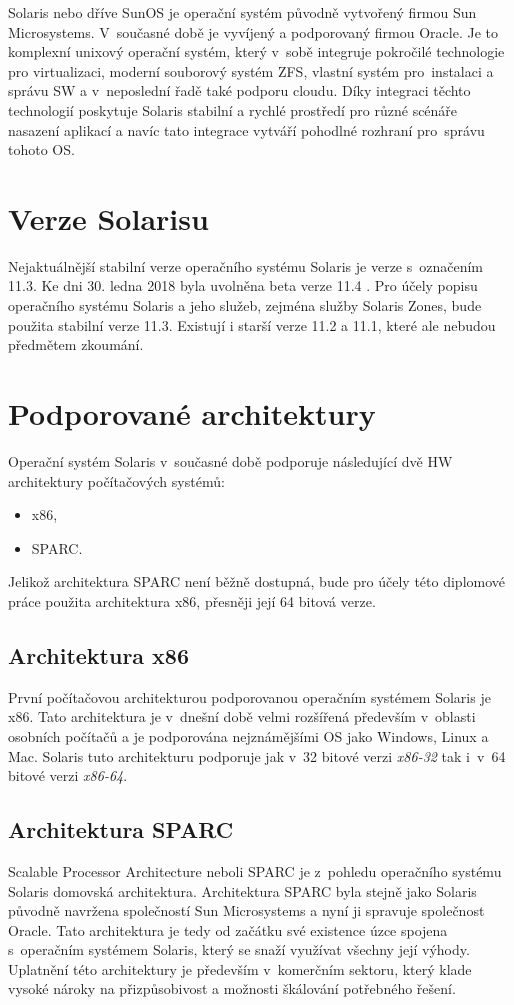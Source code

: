 \label{chapter:solaris}
Solaris nebo dříve SunOS je operační systém původně vytvořený firmou Sun Microsystems. V~současné době je vyvíjený a podporovaný
firmou Oracle. Je to komplexní unixový operační systém, který v~sobě integruje pokročilé technologie pro virtualizaci, moderní
souborový systém ZFS, vlastní systém pro~instalaci a správu SW a v~neposlední řadě také podporu cloudu. Díky integraci těchto
technologií poskytuje Solaris stabilní a rychlé prostředí pro různé scénáře nasazení aplikací a navíc tato integrace vytváří
pohodlné rozhraní pro~správu tohoto OS. 
\section{Verze Solarisu}
\label{chapter:solaris:version}
Nejaktuálnější stabilní verze operačního systému Solaris je verze s~označením 11.3. Ke dni 30. ledna 2018 byla uvolněna beta
verze 11.4 \cite{oracle:solaris:beta}. Pro účely popisu operačního systému Solaris a jeho služeb, zejména služby Solaris Zones,
bude použita stabilní verze 11.3. Existují i starší verze 11.2 a 11.1, které ale nebudou předmětem zkoumání.
\section{Podporované architektury}
\label{chapter:solaris:support}
Operační systém Solaris v~současné době podporuje následující dvě HW architektury počítačových systémů:
\begin{itemize}
 \item x86,
 \item SPARC.
\end{itemize}
Jelikož architektura SPARC není běžně dostupná, bude pro účely této diplomové práce použita architektura x86, přesněji
její 64 bitová verze.
\subsection{Architektura x86}
\label{chapter:solaris:support:x86}
První počítačovou architekturou podporovanou operačním systémem Solaris je x86. Tato architektura je v~dnešní době velmi rozšířená
především v~oblasti osobních počítačů a je podporována nejznámějšími OS jako Windows, Linux a Mac. Solaris tuto architekturu
podporuje jak v~32 bitové verzi \textit{x86-32} tak i~v~64 bitové verzi \textit{x86-64}.
\subsection{Architektura SPARC}
\label{chapter:solaris:support:sparc}
Scalable Processor Architecture neboli SPARC je z~pohledu operačního systému Solaris domovská architektura. Architektura SPARC
byla stejně jako Solaris původně navržena společností Sun Microsystems a nyní ji spravuje společnost Oracle. Tato architektura
je tedy od začátku své existence úzce spojena s~operačním systémem Solaris, který se snaží využívat všechny její výhody.
Uplatnění této architektury je především v~komerčním sektoru, který klade vysoké nároky na přizpůsobivost a možnosti škálování
potřebného řešení.
